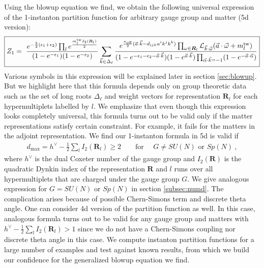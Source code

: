 \documentclass[letterpaper, 11pt]{article}
\def\CL{{\cal L}}
\def\e{\epsilon}
\def\w{\omega}
\def\half{\frac{1}{2}}
\begin{document}
Using the blowup equation we find, we obtain the following universal expression of the 1-instanton partition function for arbitrary gauge group and matter (5d version):
\begin{align}
\boxed{
  Z_1=\ \frac{e^{-\frac{b}{2}(\e_1 + \e_2)}\prod_{l}e^{\frac{m^\text{tw}_l I_2(\boldsymbol{R}_l)}{2}}}{(1-e^{-\e_1})(1-e^{-\e_2})} \sum_{\vec{k}\in\Delta_\ell}\frac{e^{\frac{\kappa_{\text{eff}}}{2}(\vec{a}\cdot\vec{k}-d_{ijk}a^ik^jk^k)}\prod_{\w \in \boldsymbol{R}_l} \CL_{\vec{k}\cdot\vec{\w}}(\vec{a}\cdot \vec{\w} + m_{l}^\text{tw})}{(1-e^{-\e_1-\e_2-\vec{a}\cdot\vec{k}})(1-e^{\vec{a}\cdot\vec{k}})\prod_{\vec{\alpha}\cdot \vec{k}=-1}(1-e^{-\vec{a}\cdot\vec{\alpha}})}}
\end{align} 
Various symbols in this expression will be explained later in section \ref{sec:blowup}. But we highlight here that this formula depends only on group theoretic data such as the set of long roots $\Delta_\ell$ and weight vectors for representation $\mathbf{R}_l$ for each hypermultiplets labelled by $l$. 
We emphasize that even though this expression looks completely universal, this formula turns out to be valid only if the matter representations satisfy certain constraint. For example, it fails for the matters in the adjoint representation. We find our 1-instanton formula in 5d is valid if 
\begin{align}
  d_\text{max} = h^\vee -\frac{1}{2}\sum_l I_2(\mathbf{R}_l) \ge 2 \qquad \textrm{for } \quad G \neq SU(N) \textrm{ or } Sp(N) \ ,
\end{align}
where $h^\vee$ is the dual Coxeter number of the gauge group and $I_2(\mathbf{R})$ is the quadratic Dynkin index of the representation $\mathbf{R}$ and $l$ runs over all hypermultiplets that are charged under the gauge group $G$. We give analogous expression for $G=SU(N)$ or $Sp(N)$ in section \ref{subsec:numd}. The complication arises because of possible Chern-Simons term and discrete theta angle. One can consider 4d version of the partition function as well. In this case, analogous formula turns out to be valid for any gauge group and matters with $h^\vee - \half \sum_l I_2(\mathbf{R}_l) >1$ since we do not have a Chern-Simons coupling nor discrete theta angle in this case. 
We compute instanton partition functions for a large number of examples and test against known results, from which we build our confidence for the generalized blowup equation we find. 
\end{document}
